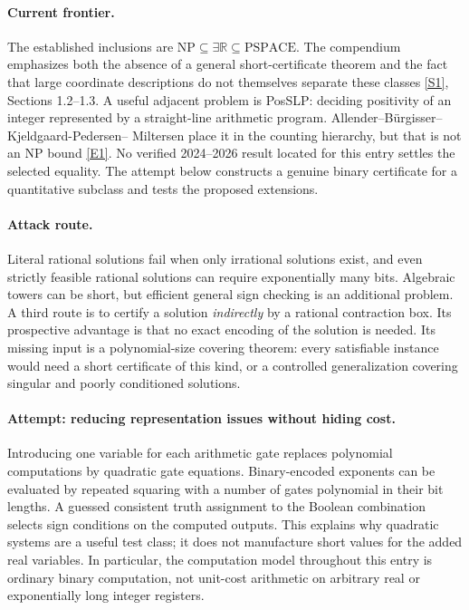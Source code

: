 \documentclass[11pt,a4paper]{article}
\newcommand{\R}{\mathbb{R}}
\newcommand{\sref}[2]{\hyperlink{source:#1:#2}{[S#2]}}
\newcommand{\eref}[2]{\hyperlink{extra:#1:#2}{[E#2]}}
\numberwithin{equation}{section}
\begin{document}
\paragraph{Current frontier.}
The established inclusions are
$\mathrm{NP}\subseteq\exists\R\subseteq\mathrm{PSPACE}$. The compendium
emphasizes both the absence of a general short-certificate theorem and the
fact that large coordinate descriptions do not themselves separate these
classes \sref{158}{1}, Sections 1.2--1.3. A useful adjacent problem is
\textsf{PosSLP}: deciding positivity of an integer represented by a
straight-line arithmetic program. Allender--B\"urgisser--Kjeldgaard-Pedersen--
Miltersen place it in the counting hierarchy, but that is not an NP bound
\eref{158}{1}. No verified 2024--2026 result located for this entry settles
the selected equality. The attempt below constructs a genuine binary
certificate for a quantitative subclass and tests the proposed extensions.

\paragraph{Attack route.}
Literal rational solutions fail when only irrational solutions exist, and
even strictly feasible rational solutions can require exponentially many
bits. Algebraic towers can be short, but efficient general sign checking
is an additional problem. A third route is to certify a solution
\emph{indirectly} by a rational contraction box. Its prospective advantage
is that no exact encoding of the solution is needed. Its missing input is
a polynomial-size covering theorem: every satisfiable instance would need
a short certificate of this kind, or a controlled generalization covering
singular and poorly conditioned solutions.

\paragraph{Attempt: reducing representation issues without hiding cost.}
Introducing one variable for each arithmetic gate replaces polynomial
computations by quadratic gate equations. Binary-encoded exponents can be
evaluated by repeated squaring with a number of gates polynomial in their
bit lengths. A guessed consistent truth assignment to the Boolean
combination selects sign conditions on the computed outputs. This explains
why quadratic systems are a useful test class; it does not manufacture
short values for the added real variables. In particular, the computation
model throughout this entry is ordinary binary computation, not unit-cost
arithmetic on arbitrary real or exponentially long integer registers.
\end{document}
